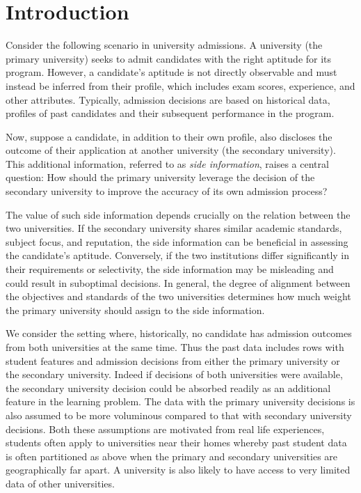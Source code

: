 \section{Introduction}
Consider the following scenario in university admissions. A university (the primary university) seeks to admit candidates with the right aptitude for its program. However, a candidate’s aptitude is not directly observable and must instead be inferred from their profile, which includes exam scores, experience, and other attributes. Typically, admission decisions are based on historical data, profiles of past candidates and their subsequent performance in the program.

Now, suppose a candidate, in addition to their own profile, also discloses the outcome of their application at another university (the secondary university). This additional information, referred to as \emph{side information}, raises a central question: How should the primary university leverage the decision of the secondary university to improve the accuracy of its own admission process?

The value of such side information depends crucially on the relation between the two universities. If the secondary university shares similar academic standards, subject focus, and reputation, the side information can be beneficial in assessing the candidate's aptitude. Conversely, if the two institutions differ significantly in their requirements or selectivity, the side information may be misleading and could result in suboptimal decisions. In general, the degree of alignment between the objectives and standards of the two universities determines how much weight the primary university should assign to the side information.

We consider the setting where, historically, no candidate has admission outcomes from both universities at the same time. Thus the past data includes rows with student features and admission decisions from either the primary university or the secondary university. Indeed if decisions of both universities were available, the secondary university decision could be absorbed readily as an additional feature in the learning problem. The data with the primary university decisions is also assumed to be more voluminous compared to that with secondary university decisions. Both these assumptions are motivated from real life experiences, students often apply to universities near their homes whereby past student data is often partitioned as above when the primary and secondary universities are geographically far apart. A university is also likely to have access to very limited data of other universities.

